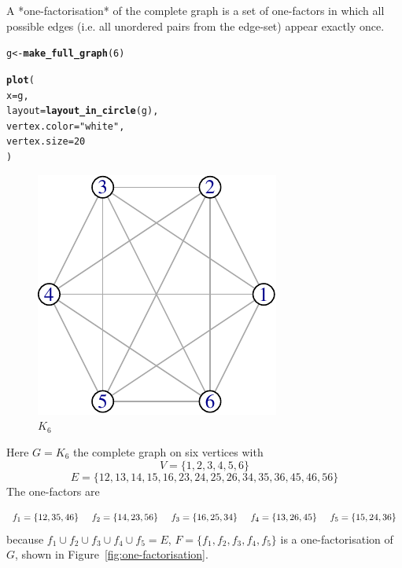 \documentclass[
  11pt,
  a4paper]{book}\usepackage[]{graphicx}\usepackage[]{xcolor}
\makeatletter
\def\maxwidth{ %
  \ifdim\Gin@nat@width>\linewidth
    \linewidth
  \else
    \Gin@nat@width
  \fi
}
\newcommand{\hlnum}[1]{\textcolor[rgb]{0.686,0.059,0.569}{#1}}%
\newcommand{\hlstr}[1]{\textcolor[rgb]{0.192,0.494,0.8}{#1}}%
\newcommand{\hlstd}[1]{\textcolor[rgb]{0.345,0.345,0.345}{#1}}%
\newcommand{\hlkwb}[1]{\textcolor[rgb]{0.69,0.353,0.396}{#1}}%
\newcommand{\hlkwc}[1]{\textcolor[rgb]{0.333,0.667,0.333}{#1}}%
\newcommand{\hlkwd}[1]{\textcolor[rgb]{0.737,0.353,0.396}{\textbf{#1}}}%
\newenvironment{kframe}{%
 \def\at@end@of@kframe{}%
 \ifinner\ifhmode%
  \def\at@end@of@kframe{\end{minipage}}%
  \begin{minipage}{\columnwidth}%
 \fi\fi%
 \def\FrameCommand##1{\hskip\@totalleftmargin \hskip-\fboxsep
 \colorbox{shadecolor}{##1}\hskip-\fboxsep
     \hskip-\linewidth \hskip-\@totalleftmargin \hskip\columnwidth}%
 \MakeFramed {\advance\hsize-\width
   \@totalleftmargin\z@ \linewidth\hsize
   \@setminipage}}%
 {\par\unskip\endMakeFramed%
 \at@end@of@kframe}
\newenvironment{knitrout}{}{} %
\def\maxwidth{\ifdim\Gin@nat@width>\linewidth\linewidth\else\Gin@nat@width\fi}
\newcounter{example}
\makeatother
\begin{document}
A *one-factorisation* of the complete graph is a set of
one-factors in which all possible edges (i.e. all unordered
pairs from the edge-set) appear exactly once.

\begin{knitrout}
\color{fgcolor}\begin{kframe}
\begin{alltt}
\hlstd{g} \hlkwb{<-} \hlkwd{make_full_graph}\hlstd{(}\hlnum{6}\hlstd{)}

\hlkwd{plot}\hlstd{(}
  \hlkwc{x}            \hlstd{= g,}
  \hlkwc{layout}       \hlstd{=} \hlkwd{layout_in_circle}\hlstd{(g),}
  \hlkwc{vertex.color} \hlstd{=} \hlstr{"white"}\hlstd{,}
  \hlkwc{vertex.size}  \hlstd{=} \hlnum{20}
\hlstd{)}
\end{alltt}
\end{kframe}\begin{figure}
\includegraphics[width=\maxwidth]{figure/K6-1} \caption[$K_6$]{$K_6$}\label{fig:K6}
\end{figure}

\end{knitrout}

\begin{example}
Here
$G = K_6$
the complete graph on six vertices with
$$V = \{1, 2, 3, 4, 5, 6\}$$
$$E = \{12, 13, 14, 15, 16, 23, 24, 25, 26, 34, 35, 36, 45, 46, 56\}$$
The one-factors are

$$
f_1 = \{12, 35, 46\} \hspace{0.5cm}
f_2 = \{14, 23, 56\} \hspace{0.5cm}
f_3 = \{16, 25, 34\} \hspace{0.5cm}
f_4 = \{13, 26, 45\} \hspace{0.5cm} 
f_5 = \{15, 24, 36\}
$$
because
$f_1 \cup f_2 \cup f_3 \cup f_4 \cup f_5 = E$,
$F = \{f_1, f_2, f_3, f_4, f_5\}$
is a one-factorisation of
$G$,
shown in Figure~\ref{fig:one-factorisation}.
\end{example}
\end{document}
